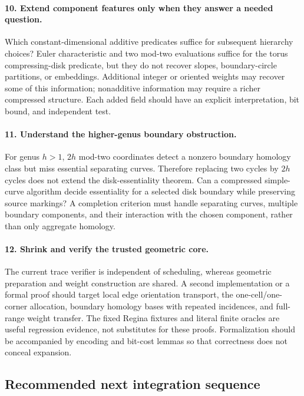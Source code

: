 \paragraph{10. Extend component features only when they answer a needed
question.}
Which constant-dimensional additive predicates suffice for subsequent
hierarchy choices?  Euler characteristic and two mod-two evaluations suffice
for the torus compressing-disk predicate, but they do not recover slopes,
boundary-circle partitions, or embeddings.  Additional integer or oriented
weights may recover some of this information; nonadditive information may
require a richer compressed structure.  Each added field should have an
explicit interpretation, bit bound, and independent test.

\paragraph{11. Understand the higher-genus boundary obstruction.}
For genus $h>1$, $2h$ mod-two coordinates detect a nonzero boundary homology
class but miss essential separating curves.  Therefore replacing two cycles
by $2h$ cycles does not extend the disk-essentiality theorem.  Can a
compressed simple-curve algorithm decide essentiality for a selected disk
boundary while preserving source markings?  A completion criterion must
handle separating curves, multiple boundary components, and their
interaction with the chosen component, rather than only aggregate homology.

\paragraph{12. Shrink and verify the trusted geometric core.}
The current trace verifier is independent of scheduling, whereas geometric
preparation and weight construction are shared.  A second implementation or
a formal proof should target local edge orientation transport, the
one-cell/one-corner allocation, boundary homology bases with repeated
incidences, and full-range weight transfer.  The fixed Regina fixtures and
literal finite oracles are useful regression evidence, not substitutes for
these proofs.  Formalization should be accompanied by encoding and bit-cost
lemmas so that correctness does not conceal expansion.

\subsection{Recommended next integration sequence}

